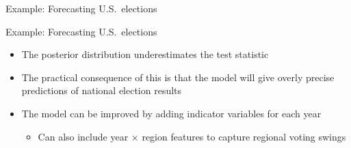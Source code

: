 \begin{frame}{Example: Forecasting U.S.\ elections}
  \begin{center}
  \end{center}
\end{frame}

\begin{frame}{Example: Forecasting U.S.\ elections}
  \begin{itemize}
    \item The posterior distribution underestimates the test statistic
    \vspace{\baselineskip}
    \pause
    \item The practical consequence of this is that the model will give overly precise predictions of national election results
    \vspace{\baselineskip}
    \pause
    \item The model can be improved by adding indicator variables for each year
    \begin{itemize}
      \item Can also include year $\times$ region features to capture regional voting swings
    \end{itemize}
  \end{itemize}
\end{frame}

